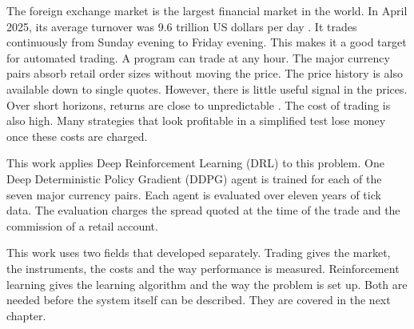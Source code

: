 \label{Chapter:Introduction}

The foreign exchange market is the largest financial market in the world. In April 2025, its average turnover was 9.6 trillion US dollars per day \cite{bis_otc_2025}. It trades continuously from Sunday evening to Friday evening. This makes it a good target for automated trading. A program can trade at any hour. The major currency pairs absorb retail order sizes without moving the price. The price history is also available down to single quotes. However, there is little useful signal in the prices. Over short horizons, returns are close to unpredictable \cite{fama_efficient_1970}. The cost of trading is also high. Many strategies that look profitable in a simplified test lose money once these costs are charged.

This work applies Deep Reinforcement Learning (DRL) to this problem. One Deep Deterministic Policy Gradient (DDPG) \cite{lillicrap_continuous_2015} agent is trained for each of the seven major currency pairs. Each agent is evaluated over eleven years of tick data. The evaluation charges the spread quoted at the time of the trade and the commission of a retail account.











This work uses two fields that developed separately. Trading gives the market, the instruments, the costs and the way performance is measured. Reinforcement learning gives the learning algorithm and the way the problem is set up. Both are needed before the system itself can be described. They are covered in the next chapter.